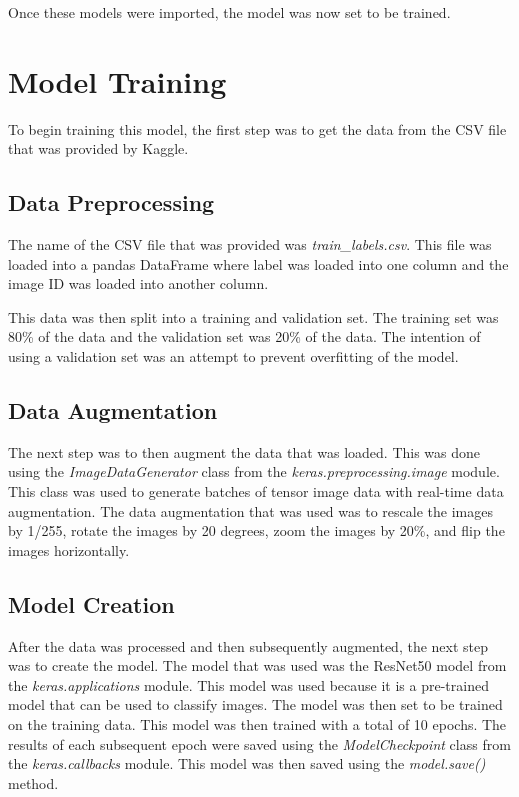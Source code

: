 \documentclass[
	a4paper, %
	10pt, %
	unnumberedsections, %
	twoside, %
]{LTJournalArticle}
\begin{document}
Once these models were imported, the model was now set to be trained.

\section{Model Training}

To begin training this model, the first step was to get the data from the CSV file that was provided by Kaggle.

\subsection{Data Preprocessing}

The name of the CSV file that was provided was \textit{train\_labels.csv}. This file was loaded into a pandas DataFrame where label was loaded into one column and the image ID was loaded into another
column.

This data was then split into a training and validation set. The training set was 80\% of the data and the validation set was 20\% of the data. The intention of using a validation set was an attempt to
prevent overfitting of the model.

\subsection{Data Augmentation}

The next step was to then augment the data that was loaded. This was done using the \textit{ImageDataGenerator} class from the \textit{keras.preprocessing.image} module. This class was used to generate
batches of tensor image data with real-time data augmentation. The data augmentation that was used was to rescale the images by 1/255, rotate the images by 20 degrees, zoom the images by 20\%, and flip
the images horizontally.

\subsection{Model Creation}

After the data was processed and then subsequently augmented, the next step was to create the model. The model that was used was the ResNet50 model from the \textit{keras.applications} module. This model
was used because it is a pre-trained model that can be used to classify images. The model was then set to be trained on the training data. This model was then trained with a total of 10 epochs. The results
of each subsequent epoch were saved using the \textit{ModelCheckpoint} class from the \textit{keras.callbacks} module. This model was then saved using the \textit{model.save()} method. 
\end{document}
